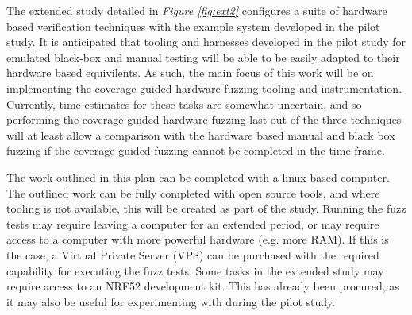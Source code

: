 \documentclass[11pt]{article}
\begin{document}
The extended study detailed in \textit{Figure \ref{fig:ext2}} configures a
suite of hardware based verification techniques with the example system
developed in the pilot study. It is anticipated that tooling and harnesses
developed in the pilot study for emulated black-box and manual testing will be
able to be easily adapted to their hardware based equivilents. As such, the
main focus of this work will be on implementing the coverage guided hardware
fuzzing tooling and instrumentation. Currently, time estimates for these tasks
are somewhat uncertain, and so performing the coverage guided hardware fuzzing
last out of the three techniques will at least allow a comparison with the
hardware based manual and black box fuzzing if the coverage guided fuzzing
cannot be completed in the time frame.


The work outlined in this plan can be completed with a linux based computer.
The outlined work can be fully completed with open source tools, and where
tooling is not available, this will be created as part of the study. Running
the fuzz tests may require leaving a computer for an extended period, or may
require access to a computer with more powerful hardware (e.g. more RAM). If
this is the case, a Virtual Private Server (VPS) can be purchased with the
required capability for executing the fuzz tests. Some tasks in the extended
study may require access to an NRF52 development kit. This has already been
procured, as it may also be useful for experimenting with during the pilot study.

\pagebreak

\end{document}
